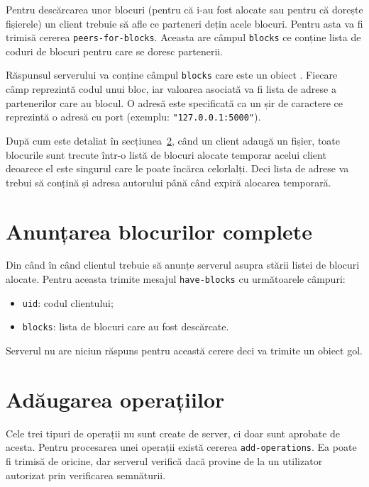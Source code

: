 \documentclass[a4wide,12pt]{report}
\newcommand{\cod}[1]{\texttt{#1}}
\newcommand{\acr}[1]{{\textsmaller[1]{\textsc{#1}}}} %
\begin{document}
Pentru descărcarea unor blocuri (pentru că i-au fost alocate sau pentru că dorește fișierele) un client trebuie să afle
ce parteneri dețin acele blocuri. Pentru asta va fi trimisă cererea \cod{peers-for-blocks}. Aceasta are câmpul
\cod{blocks} ce conține lista de coduri de blocuri pentru care se doresc partenerii.

Răspunsul serverului va conține câmpul \cod{blocks} care este un obiect \acr{JSON}. Fiecare câmp reprezintă codul unui
bloc, iar valoarea asociată va fi lista de adrese a partenerilor care au blocul. O adresă este specificată ca un șir de
caractere ce reprezintă o adresă \acr{IP} cu port (exemplu: \cod{"127.0.0.1:5000"}).

După cum este detaliat în secțiunea~\ref{sec:adop}, când un client adaugă un fișier, toate blocurile sunt trecute într-o
listă de blocuri alocate temporar acelui client deoarece el este singurul care le poate încărca celorlalți. Deci lista
de adrese va trebui să conțină și adresa autorului până când expiră alocarea temporară.

\section{Anunțarea blocurilor complete} %

Din când în când clientul trebuie să anunțe serverul asupra stării listei de blocuri alocate. Pentru aceasta trimite 
mesajul \cod{have-blocks} cu următoarele câmpuri:

\begin{itemize}
    \item \cod{uid}: codul clientului;
    \item \cod{blocks}: lista de blocuri care au fost descărcate.
\end{itemize}

Serverul nu are niciun răspuns pentru această cerere deci va trimite un obiect \acr{JSON} gol.

\section{Adăugarea operațiilor} %
\label{sec:adop}

Cele trei tipuri de operații nu sunt create de server, ci doar sunt aprobate de acesta. Pentru procesarea unei operații
există cererea \cod{add-operations}. Ea poate fi trimisă de oricine, dar serverul verifică dacă provine de la un
utilizator autorizat prin verificarea semnăturii.
\end{document}
